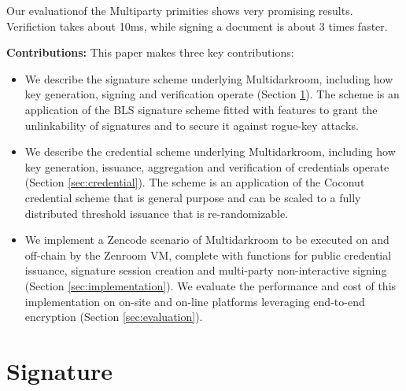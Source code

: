 \documentclass{article}
\begin{document}
Our evaluationof the Multiparty primities shows very promising
results. Verifiction takes about 10ms,  while signing a document is
about 3 times faster. 

\textbf{Contributions:} This paper makes three key contributions:

\begin{itemize}

\item We describe the signature scheme underlying Multidarkroom,
  including how key generation, signing and verification operate
  (Section \ref{sec:signature}). The scheme is an application of the
  BLS signature scheme \citep{asiacrypt-bls} fitted with features to
  grant the unlinkability of signatures and to secure it against
  rogue-key attacks.

\item We describe the credential scheme underlying Multidarkroom,
  including how key generation, issuance, aggregation and verification
  of credentials operate (Section \ref{sec:credential}). The scheme is
  an application of the Coconut credential scheme \citep{coconut-2018}
  that is general purpose and can be scaled to a fully distributed
  threshold issuance that is re-randomizable.

\item We implement a Zencode scenario of Multidarkroom to be executed
  on and off-chain by the Zenroom VM, complete with functions for
  public credential issuance, signature session creation and
  multi-party non-interactive signing (Section
  \ref{sec:implementation}). We evaluate the performance and cost of
  this implementation on on-site and on-line platforms leveraging
  end-to-end encryption (Section \ref{sec:evaluation}).

\end{itemize}

\section{Signature}
\label{sec:signature}

\lipsum[1]

\end{document}
